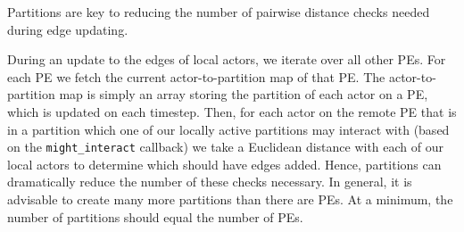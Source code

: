 Partitions are key to reducing the number of pairwise distance checks needed
during edge updating.

During an update to the edges of local actors, we iterate over all other PEs. For
each PE we fetch the current actor-to-partition map of that PE. The
actor-to-partition map is simply an array storing the partition of each actor
on a PE, which is updated on each timestep. Then, for each actor on the remote
PE that is in a partition which one of our locally active partitions may interact
with (based on the \texttt{might\_interact} callback) we take a Euclidean
distance with each of our local actors to determine which should have edges
added. Hence, partitions can dramatically reduce the number of these checks
necessary. In general, it is advisable to create many more partitions than there
are PEs. At a minimum, the number of partitions should equal the number of PEs.
